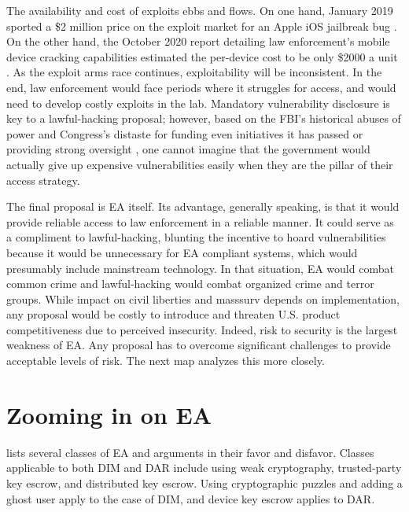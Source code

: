 The availability and cost of exploits ebbs and flows. On one hand, January 2019 sported a \$2 million price on the
exploit market for an Apple iOS jailbreak bug \cite{goodin_zeroday_2019}. On the other hand, the October 2020 report
detailing law enforcement's mobile device cracking capabilities estimated the per-device cost to be only \$2000 a unit
\cite{koepke_2020}. As the exploit arms race continues, exploitability will be inconsistent. In the end, law enforcement
would face periods where it struggles for access, and would need to develop costly exploits in the lab. Mandatory
vulnerability disclosure is key to a \ac{lawful-hacking} proposal; however, based on the \ac{FBI}'s historical abuses of
power \cite{shamsi_2011} and Congress's distaste for funding even initiatives it has passed \cite{keller_internet_2019}
or providing strong oversight \cite{johnson_congressional_2004}, one cannot imagine that the government would actually
give up expensive vulnerabilities easily when they are the pillar of their access strategy.

The final proposal is \ac{EA} itself. Its advantage, generally speaking, is that it would provide reliable access to law
enforcement in a reliable manner. It could serve as a compliment to \ac{lawful-hacking}, blunting the incentive to hoard
vulnerabilities because it would be unnecessary for \ac{EA} compliant systems, which would presumably include mainstream
technology. In that situation, \ac{EA} would combat common crime and \ac{lawful-hacking} would combat organized crime
and terror groups. While impact on civil liberties and \ac{masssurv} depends on implementation, any proposal would be
costly to introduce and threaten U.S. product competitiveness due to perceived insecurity. Indeed, risk to security is
the largest weakness of \ac{EA}. Any proposal has to overcome significant challenges to provide acceptable levels of
risk. The next map analyzes this more closely.


\section{Zooming in on EA}

 lists several classes of \ac{EA} and arguments in their favor and disfavor. Classes applicable
to both \ac{DIM} and \ac{DAR} include using weak cryptography, trusted-party key escrow, and distributed key escrow.
Using cryptographic puzzles and adding a ghost user apply to the case of \ac{DIM}, and device key escrow applies to
\ac{DAR}.

